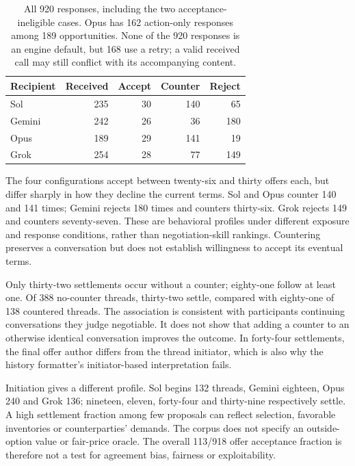 \begin{table}[t]
\centering\small
\begin{tabular}{@{}lrrrr@{}}
\toprule
Recipient & Received & Accept & Counter & Reject\\
\midrule
Sol & 235 & 30 & 140 & 65\\
Gemini & 242 & 26 & 36 & 180\\
Opus & 189 & 29 & 141 & 19\\
Grok & 254 & 28 & 77 & 149\\
\bottomrule
\end{tabular}
\caption{All 920 responses, including the two acceptance-ineligible cases. Opus has 162 action-only responses among 189 opportunities. None of the 920 responses is an engine default, but 168 use a retry; a valid received call may still conflict with its accompanying content.}
\label{tab:styles}
\end{table}

The four configurations accept between twenty-six and thirty offers each, but differ sharply in how they decline the current terms. Sol and Opus counter 140 and 141 times; Gemini rejects 180 times and counters thirty-six. Grok rejects 149 and counters seventy-seven. These are behavioral profiles under different exposure and response conditions, rather than negotiation-skill rankings. Countering preserves a conversation but does not establish willingness to accept its eventual terms.

Only thirty-two settlements occur without a counter; eighty-one follow at least one. Of 388 no-counter threads, thirty-two settle, compared with eighty-one of 138 countered threads. The association is consistent with participants continuing conversations they judge negotiable. It does not show that adding a counter to an otherwise identical conversation improves the outcome. In forty-four settlements, the final offer author differs from the thread initiator, which is also why the history formatter's initiator-based interpretation fails.

Initiation gives a different profile. Sol begins 132 threads, Gemini eighteen, Opus 240 and Grok 136; nineteen, eleven, forty-four and thirty-nine respectively settle. A high settlement fraction among few proposals can reflect selection, favorable inventories or counterparties' demands. The corpus does not specify an outside-option value or fair-price oracle. The overall 113/918 offer acceptance fraction is therefore not a test for agreement bias, fairness or exploitability.


